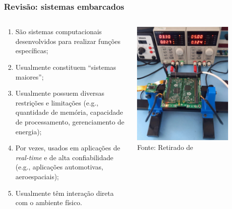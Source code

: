 \documentclass{beamer}
\begin{document}
\begin{frame}[fragile]
    \frametitle{Revisão: sistemas embarcados}

    \begin{columns}
        \begin{column}{0.6\textwidth}
            \begin{enumerate}\footnotesize
                \item São sistemas computacionais desenvolvidos para realizar funções específicas;
                \item Usualmente constituem ``sistemas maiores'';
                \item Usualmente possuem diversas restrições e limitações (e.g., quantidade de memória, capacidade de processamento, gerenciamento de energia);
                \item Por vezes, usados em aplicações de \textit{real-time} e de alta confiabilidade (e.g., aplicações automotivas, aeroespaciais);
                \item Usualmente têm interação direta com o ambiente físico.
            \end{enumerate}
        \end{column}
        
        \begin{column}{0.4\textwidth}
            \begin{center}
                \includegraphics[width=0.8\textwidth]{../figures/cubesat_obc_rasp.jpeg}\\
                \footnotesize Fonte: Retirado de \cite{hattersley_2021}
            \end{center}
        \end{column}
    \end{columns}


\end{frame}
\end{document}
